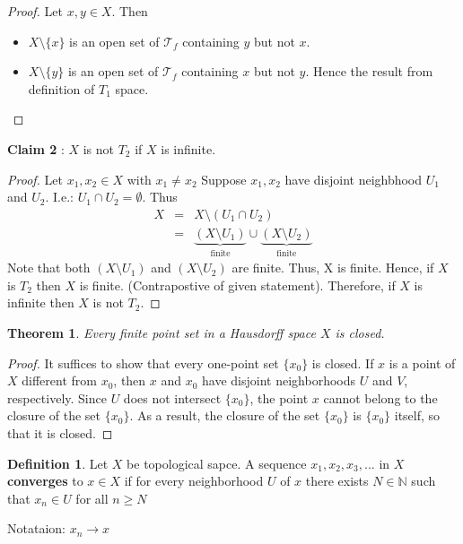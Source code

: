 \documentclass[
]{book}
\providecommand{\tightlist}{%
  \setlength{\itemsep}{0pt}\setlength{\parskip}{0pt}}
\newtheorem{theorem}{Theorem}[chapter]
\theoremstyle{definition}
\newtheorem{definition}{Definition}[chapter]
\theoremstyle{definition}
\theoremstyle{definition}
\theoremstyle{definition}
\theoremstyle{remark}
\begin{document}
\begin{proof}

Let \(x,y\in X\). Then

\begin{itemize}
\tightlist
\item
  \(X\setminus \{x\}\) is an open set of \(\mathcal{T}_{f}\) containing \(y\) but not \(x\).
\item
  \(X\setminus \{y\}\) is an open set of \(\mathcal{T}_{f}\) containing \(x\)
  but not \(y\).
  Hence the result from definition of \(T_1\) space.
\end{itemize}

\end{proof}

\textbf{Claim 2} : \(X\) is not \(T_2\) if \(X\) is infinite.

\begin{proof}
Let \(x_1,x_2\in X\) with \(x_1\neq x_2\) Suppose \(x_1,x_2\) have disjoint neighbhood \(U_1\) and \(U_2\). I.e.: \(U_1\cap U_2=\emptyset\). Thus
\begin{eqnarray}
X &=& X\setminus (U_1\cap U_2)\\
&=& \underbrace{(X \setminus U_1 )}_{\text{finite}} \cup \underbrace{(X\setminus U_2)}_{\text{finite}}
\end{eqnarray}
Note that both \((X \setminus U_1 )\) and \((X \setminus U_2 )\) are finite. Thus, X is finite. Hence, if \(X\) is \(T_2\) then \(X\) is finite. (Contrapostive of given statement). Therefore, if \(X\) is infinite then \(X\) is not \(T_2\).
\end{proof}

\begin{theorem}
\protect\hypertarget{thm:unnamed-chunk-81}{}\label{thm:unnamed-chunk-81}Every finite point set in a Hausdorff space \(X\) is closed.
\end{theorem}

\begin{proof}
It suffices to show that every one-point set \(\{x_0\}\) is closed. If \(x\) is a point of \(X\)
different from \(x_0\), then \(x\) and \(x_0\) have disjoint neighborhoods \(U\) and \(V\), respectively.
Since \(U\) does not intersect \(\{x_0\}\), the point \(x\) cannot belong to the closure of the set \(\{x_0\}\).
As a result, the closure of the set \(\{x_0\}\) is \(\{x_0\}\) itself, so that it is closed.
\end{proof}

\begin{definition}
\protect\hypertarget{def:unnamed-chunk-83}{}\label{def:unnamed-chunk-83}Let \(X\) be topological sapce. A sequence \(x_1,x_2,x_3,...\) in \(X\) \textbf{converges} to \(x\in X\) if for every neighborhood \(U\) of \(x\) there exists \(N\in \mathbb{N}\) such that \(x_n \in U\) for all \(n\geq N\)

Notataion: \(x_n \to x\)
\end{definition}
\end{document}
